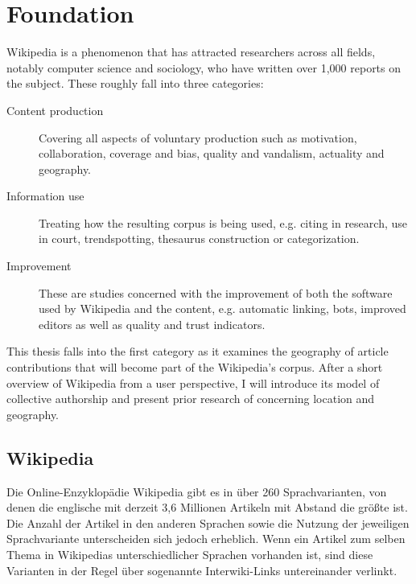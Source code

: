 \chapter{Foundation}\label{ch:foundation}

Wikipedia is a phenomenon that has attracted researchers across all fields, notably computer science and sociology, who have written over 1,000 reports on the subject.\cite{nielsen2011wikipedia}
These roughly fall into three categories: 
\begin{description}
\item[Content production] Covering all aspects of voluntary production such as motivation, collaboration, coverage and bias, quality and vandalism, actuality and geography.
\item[Information use] Treating how the resulting corpus is being used, e.g. citing in research, use in court, trendspotting, thesaurus construction or categorization.
\item[Improvement] These are studies concerned with the improvement of both the software used by Wikipedia and the content, e.g. automatic linking, bots, improved editors as well as quality and trust indicators. 
\end{description}

This thesis falls into the first category as it examines the geography of article contributions that will become part of the Wikipedia's corpus.
After a short overview of Wikipedia from a user perspective, I will introduce its model of collective authorship and present prior research of concerning location and geography. 

\section{Wikipedia}\label{sec:wikipedia}


Die Online-Enzyklopädie Wikipedia gibt es in über 260 Sprachvarianten, von denen die englische mit derzeit 3,6 Millionen Artikeln mit Abstand die größte ist.
Die Anzahl der Artikel in den anderen Sprachen sowie die Nutzung der jeweiligen Sprachvariante unterscheiden sich jedoch erheblich.\cite{wikistats}
Wenn ein Artikel zum selben Thema in Wikipedias unterschiedlicher Sprachen vorhanden ist, sind diese Varianten in der Regel über sogenannte Interwiki-Links untereinander verlinkt.

